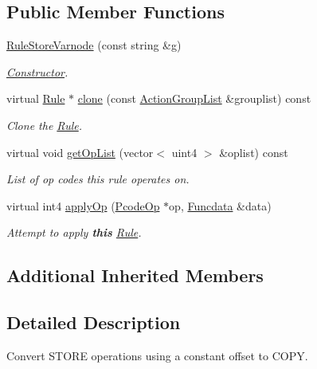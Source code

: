 \subsection*{Public Member Functions}
\begin{DoxyCompactItemize}
\item 
\mbox{\hyperlink{class_rule_store_varnode_a4925355b842b734cb617e0db60ea1c16}{Rule\+Store\+Varnode}} (const string \&g)
\begin{DoxyCompactList}\small\item\em \mbox{\hyperlink{class_constructor}{Constructor}}. \end{DoxyCompactList}\item 
virtual \mbox{\hyperlink{class_rule}{Rule}} $\ast$ \mbox{\hyperlink{class_rule_store_varnode_a8791c49e017c00b88b6d449050762b43}{clone}} (const \mbox{\hyperlink{class_action_group_list}{Action\+Group\+List}} \&grouplist) const
\begin{DoxyCompactList}\small\item\em Clone the \mbox{\hyperlink{class_rule}{Rule}}. \end{DoxyCompactList}\item 
virtual void \mbox{\hyperlink{class_rule_store_varnode_a99d44676a0cc44827c2e237655f59a0e}{get\+Op\+List}} (vector$<$ uint4 $>$ \&oplist) const
\begin{DoxyCompactList}\small\item\em List of op codes this rule operates on. \end{DoxyCompactList}\item 
virtual int4 \mbox{\hyperlink{class_rule_store_varnode_af2356cc3335eab5bc75ff0d8f5223165}{apply\+Op}} (\mbox{\hyperlink{class_pcode_op}{Pcode\+Op}} $\ast$op, \mbox{\hyperlink{class_funcdata}{Funcdata}} \&data)
\begin{DoxyCompactList}\small\item\em Attempt to apply {\bfseries{this}} \mbox{\hyperlink{class_rule}{Rule}}. \end{DoxyCompactList}\end{DoxyCompactItemize}
\subsection*{Additional Inherited Members}


\subsection{Detailed Description}
Convert S\+T\+O\+RE operations using a constant offset to C\+O\+PY. 

